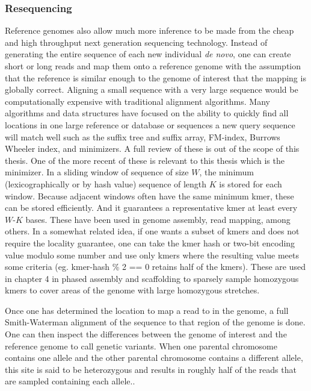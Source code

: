 \subsubsection{Resequencing}

\par{
Reference genomes also allow much more inference to be made from the cheap and high throughput next generation sequencing technology. Instead of generating the entire sequence of each new individual \textit{de novo}, one can create short or long reads and map them onto a reference genome with the assumption that the reference is similar enough to the genome of interest that the mapping is globally correct. Aligning a small sequence with a very large sequence would be computationally expensive with traditional alignment algorithms\cite{smithwaterman}\cite{needlemanwunsch}. Many algorithms and data structures have focused on the ability to quickly find all locations in one large reference or database or sequences a new query sequence will match well such as the suffix tree and suffix array, FM-index, Burrows Wheeler index, and minimizers. A full review of these is out of the scope of this thesis\cite{suffixarray}\cite{suffixtree}\cite{fmindex}\cite{fmindex2}\cite{bwa}\cite{blat}. One of the more recent of these is relevant to this thesis which is the minimizer. In a sliding window of sequence of size $W$, the minimum (lexicographically or by hash value) sequence of length $K$ is stored for each window\cite{minimizers}. Because adjacent windows often have the same minimum kmer, these can be stored efficiently. And it guarantees a representative kmer at least every $W$-$K$ bases. These have been used in genome assembly, read mapping, among others\cite{LSH}\cite{minimap2}\cite{mashmap}. In a somewhat related idea, if one wants a subset of kmers and does not require the locality guarantee, one can take the kmer hash or two-bit encoding value modulo some number and use only kmers where the resulting value meets some criteria (eg. kmer-hash \% 2 == 0 retains half of the kmers)\cite{modimizer}. These are used in chapter 4 in phased assembly and scaffolding to sparsely sample homozygous kmers to cover areas of the genome with large homozygous stretches. 
} 

\par{
Once one has determined the location to map a read to in the genome, a full Smith-Waterman alignment of the sequence to that region of the genome is done\cite{smithwaterman}. One can then inspect the differences between the genome of interest and the reference genome to call genetic variants. When one parental chromosome contains one allele and the other parental chromosome contains a different allele, this site is said to be heterozygous and results in roughly half of the reads that are sampled containing each allele.\cite{freebayes}\cite{gatk}.
}

